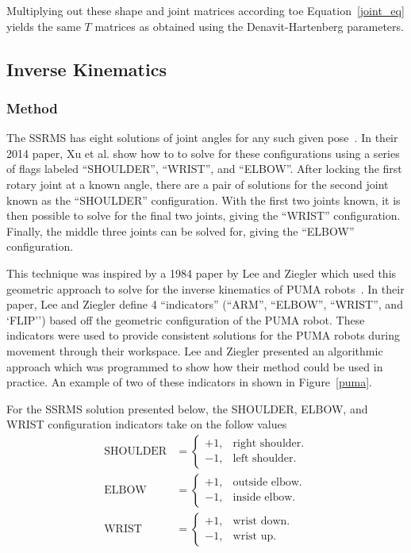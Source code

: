 \documentclass{article}
\begin{document}
Multiplying out these shape and joint matrices according toe Equation~\ref{joint_eq} yields the same $T$ matrices as obtained using the Denavit-Hartenberg parameters.

\subsection{Inverse Kinematics}
\subsubsection{Method}
The SSRMS has eight solutions of joint angles for any such given pose~\cite{xu2014analytical}.
In their 2014 paper, Xu et al. show how to to solve for these configurations using a series of flags labeled ``SHOULDER'', ``WRIST'', and ``ELBOW''.
After locking the first rotary joint at a known angle, there are a pair of solutions for the second joint known as the ``SHOULDER'' configuration.
With the first two joints known, it is then possible to solve for the final two joints, giving the ``WRIST'' configuration.
Finally, the middle three joints can be solved for, giving the ``ELBOW'' configuration.

This technique was inspired by a 1984 paper by Lee and Ziegler which used this geometric approach to solve for the inverse kinematics of PUMA robots~\cite{lee1984geometric}.
In their paper, Lee and Ziegler define 4 ``indicators'' (``ARM'', ``ELBOW'', ``WRIST'', and `FLIP'') based off the geometric configuration of the PUMA robot.
These indicators were used to provide consistent solutions for the PUMA robots during movement through their workspace.
Lee and Ziegler presented an algorithmic approach which was programmed to show how their method could be used in practice.
An example of two of these indicators in shown in Figure~\ref{puma}.

For the SSRMS solution presented below, the SHOULDER, ELBOW, and WRIST configuration indicators take on the follow values~\cite{xu2014analytical}
\begin{align*}
\text{SHOULDER}&=\begin{cases}
    +1, & \text{right shoulder}.\\
    -1, & \text{left shoulder}.
\end{cases}\\
\text{ELBOW}&=\begin{cases}
    +1, & \text{outside elbow}.\\
    -1, & \text{inside elbow}.
\end{cases}\\
\text{WRIST}&=\begin{cases}
    +1, & \text{wrist down}.\\
    -1, & \text{wrist up}.
\end{cases}
\end{align*}
\end{document}
